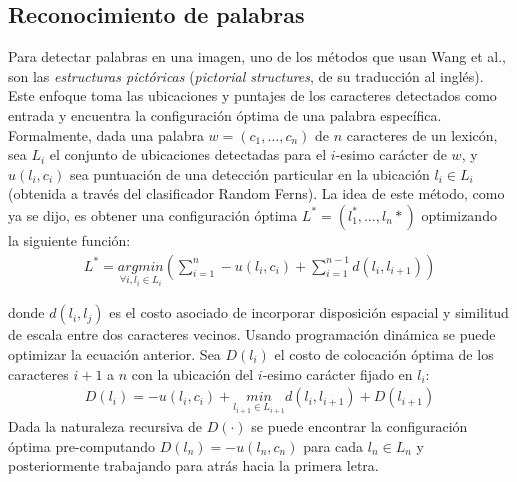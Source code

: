\subsection{Reconocimiento de palabras}
	
	Para detectar palabras en una imagen, uno de los métodos que usan Wang et al., son las \textit{estructuras pictóricas} (\textit{pictorial structures}, de su traducción al inglés). Este enfoque toma las ubicaciones y puntajes de los caracteres detectados como entrada y encuentra la configuración óptima de una palabra específica. Formalmente, dada una palabra $w=(c_1,\dots , c_n)$ de $n$ caracteres de un lexicón, sea $L_i$ el conjunto de ubicaciones detectadas para el $i$-esimo carácter de $w$, y $u(l_i, c_i)$ sea puntuación de una detección particular en la ubicación $l_i \in L_i$ (obtenida a través del clasificador Random Ferns). La idea de este método, como ya se dijo, es obtener una configuración óptima $L^{*}=(l_1^{*}, \dots, l_n{*})$ optimizando la siguiente función:
	\begin{align}
		L^{*} = \underset{\forall i, l_i\in L_i}{argmin}\left( \sum_{i=1}^n -u(l_i, c_i) + \sum_{i=1}^{n-1} d(l_i,l_{i+1}) \right)
	\end{align}		
	
	donde $d(l_i, l_j)$ es el costo asociado de incorporar disposición espacial y similitud de escala entre dos caracteres vecinos. Usando programación dinámica se puede optimizar la ecuación anterior. Sea $D(l_i)$ el costo de colocación óptima de los caracteres $i+1$ a $n$ con la ubicación del $i$-esimo carácter fijado en $l_i$:
	\begin{align}
		D(l_i) = -u(l_i,c_i) + \underset{l_{i+1}\in L_{i+1}}{min} d(l_i,l_{i+1}) + D(l_{i+1})
	\end{align}
	Dada la naturaleza recursiva de $D(\cdot)$ se puede encontrar la configuración óptima pre-computando $D(l_n) = -u(l_n,c_n)$ para cada $l_n \in L_n$ y posteriormente trabajando para atrás hacia la primera letra.
	
